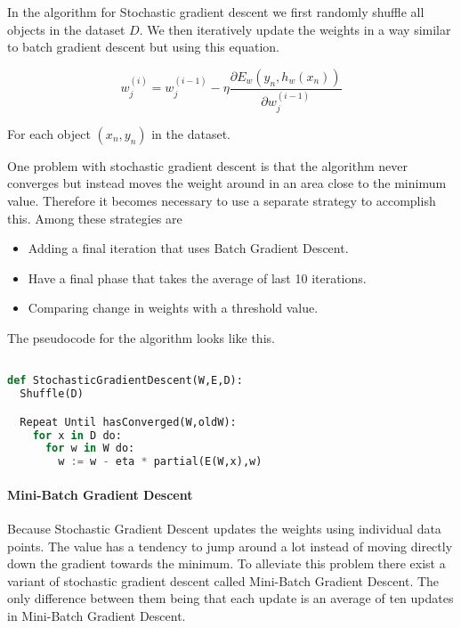 In the algorithm for Stochastic gradient descent we first randomly shuffle all objects in the dataset $D$.
We then iteratively update the weights in a way similar to batch gradient descent but using this equation.

$$ w_j^{(i)} = w_j^{(i-1)} - \eta \frac{\partial E_w(y_n, h_w(x_n))}{\partial w_j^{(i-1)}} $$

For each object $(x_n, y_n)$ in the dataset.

One problem with stochastic gradient descent is that the algorithm never converges but instead moves the weight around in an area close to the minimum value.
Therefore it becomes necessary to use a separate strategy to accomplish this.
Among these strategies are
\begin{itemize}
\item Adding a final iteration that uses Batch Gradient Descent. 
\item Have a final phase that takes the average of last 10 iterations. 
\item Comparing change in weights with a threshold value. 
\end{itemize}

The pseudocode for the algorithm looks like this.

\begin{lstlisting}[language=python]

def StochasticGradientDescent(W,E,D):
  Shuffle(D)

  Repeat Until hasConverged(W,oldW):
    for x in D do:
      for w in W do: 
        w := w - eta * partial(E(W,x),w)

\end{lstlisting}

\paragraph{Mini-Batch Gradient Descent}\label{sec:mini-batch}

Because Stochastic Gradient Descent updates the weights using individual data points.
The value has a tendency to jump around a lot instead of moving directly down the gradient towards the minimum.
To alleviate this problem there exist a variant of stochastic gradient descent called Mini-Batch Gradient Descent. 
The only difference between them being that each update is an average of ten updates in Mini-Batch Gradient Descent. 







